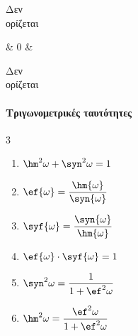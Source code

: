 \begin{center}
\begin{mytblr}{}
\begin{minipage}{.8cm}
\begin{center}
{\scriptsize Δεν\\\vspace{-1mm}ορίζεται}
\end{center}
\end{minipage} & $ 0 $ & \begin{minipage}{.8cm}
\begin{center}
{\scriptsize Δεν\\\vspace{-1mm}ορίζεται}
\end{center}
\end{minipage} 
\end{mytblr}
\end{center}
\paragraph{Τριγωνομετρικές ταυτότητες}
\begin{multicols}{3}
\begin{enumerate}[itemsep=0mm]
\item $ \hm^2{\omega}+\syn^2{\omega}=1 $
\item $ \ef{\omega}={\dfrac{\hm{\omega}}{\syn{\omega}}} $
\item $ \syf{\omega}={\dfrac{\syn{\omega}}{\hm{\omega}}} $
\item $ \ef{\omega}\cdot\syf{\omega}=1 $
\item $ \syn^2{\omega}=\dfrac{1}{1+\ef^2{\omega}} $
\item $ \hm^2{\omega}=\dfrac{\ef^2{\omega}}{1+\ef^2{\omega}} $
\end{enumerate}
\end{multicols}
